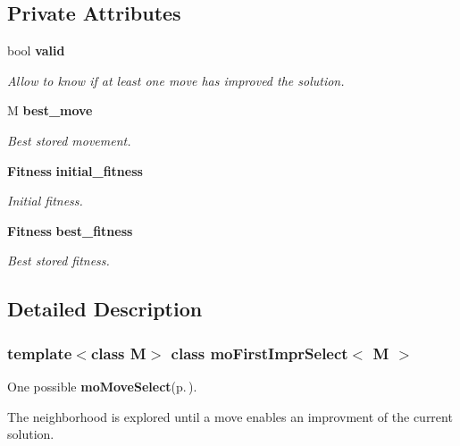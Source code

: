\subsection*{Private Attributes}
\begin{CompactItemize}
\item 
bool {\bf valid}\label{classmo_first_impr_select_r0}

\begin{CompactList}\small\item\em Allow to know if at least one move has improved the solution. \item\end{CompactList}\item 
M {\bf best\_\-move}\label{classmo_first_impr_select_r1}

\begin{CompactList}\small\item\em Best stored movement. \item\end{CompactList}\item 
{\bf Fitness} {\bf initial\_\-fitness}\label{classmo_first_impr_select_r2}

\begin{CompactList}\small\item\em Initial fitness. \item\end{CompactList}\item 
{\bf Fitness} {\bf best\_\-fitness}\label{classmo_first_impr_select_r3}

\begin{CompactList}\small\item\em Best stored fitness. \item\end{CompactList}\end{CompactItemize}


\subsection{Detailed Description}
\subsubsection*{template$<$class M$>$ class mo\-First\-Impr\-Select$<$ M $>$}

One possible {\bf mo\-Move\-Select}{\rm (p.\,\pageref{classmo_move_select})}. 

The neighborhood is explored until a move enables an improvment of the current solution. 




